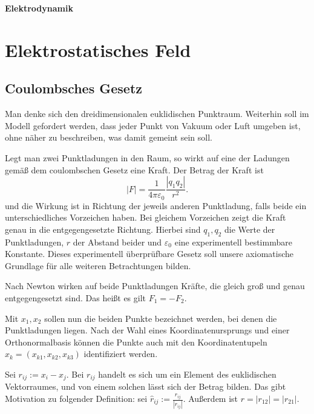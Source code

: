 \documentclass[a4paper,10pt,fleqn,twocolumn,twoside,dvipdfmx]{scrartcl}
\begin{document}
\thispagestyle{empty}

\begin{huge}
\noindent
\textbf{Elektrodynamik}
\par
\end{huge}


\tableofcontents

\section{Elektrostatisches Feld}
\subsection{Coulombsches Gesetz}

Man denke sich den dreidimensionalen euklidischen Punktraum.
Weiterhin soll im Modell gefordert werden, dass jeder Punkt von Vakuum
oder Luft umgeben ist, ohne näher zu beschreiben, was damit gemeint sein
soll.

Legt man zwei Punktladungen in den Raum, so wirkt auf eine der
Ladungen gemäß dem coulombschen Gesetz eine Kraft.
Der Betrag der Kraft ist%
\begin{equation}\label{Coulomb}
|F|=\frac{1}{4\pi\varepsilon_0}\frac{|q_1q_2|}{r^2}.
\end{equation}
und die Wirkung ist in Richtung der jeweils anderen Punktladung,
falls beide ein unterschiedliches Vorzeichen haben. Bei gleichem
Vorzeichen zeigt die Kraft genau in die entgegengesetzte Richtung.
Hierbei sind $q_1,q_2$ die Werte der Punktladungen, $r$ der
Abstand beider und $\varepsilon_0$ eine experimentell bestimmbare
Konstante. Dieses experimentell überprüfbare Gesetz soll unsere
axiomatische Grundlage für alle weiteren Betrachtungen bilden.

Nach Newton wirken auf beide Punktladungen Kräfte, die gleich groß
und genau entgegengesetzt sind. Das heißt es gilt $F_1=-F_2$.

Mit $x_1,x_2$ sollen nun die beiden Punkte bezeichnet werden,
bei denen die Punktladungen liegen. Nach der Wahl eines
Koordinatenursprungs und einer Orthonormalbasis können die
Punkte auch mit den Koordinatentupeln $x_k=(x_{k1},x_{k2},x_{k3})$
identifiziert werden.

Sei $r_{ij}:=x_i-x_j$. Bei $r_{ij}$ handelt es sich um ein
Element des euklidischen Vektorraumes, und von einem solchen lässt
sich der Betrag bilden. Das gibt Motivation zu folgender
Definition: sei $\hat r_{ij}:=\frac{r_{ij}}{|r_{ij}|}$.
Außerdem ist $r=|r_{12}|=|r_{21}|$.
\end{document}
